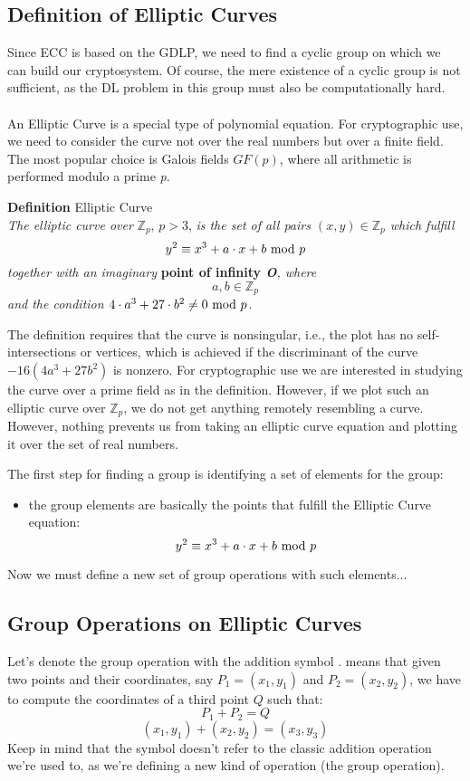 \subsection{Definition of Elliptic Curves}
Since ECC is based on the GDLP, we need to find a cyclic group on which we can build our cryptosystem. Of course, the mere existence of a cyclic group is not sufficient, as the DL problem in this group must also be computationally hard.\\\\
An Elliptic Curve is a special type of polynomial equation. For cryptographic use, we need to consider the curve not over the real numbers but over a finite field. The most popular choice is Galois fields $GF(p)$, where all arithmetic is performed modulo a prime \textit{p}.
\begin{framed}
    \hfill\break\textbf{Definition} Elliptic Curve\\
    \textit{The elliptic curve over} $\mathbb{Z}_p$, $p>3$, \textit{is the set of all pairs $(x,y)\in\mathbb{Z}_p$ which fulfill}
    $$y^2\equiv x^3+a\cdot x+b\text{ mod } p$$
    \textit{together with an imaginary} \textbf{point of infinity \textit{O}}\textit{, where}
    $$a,b\in\mathbb{Z}_p$$
    \textit{and the condition $4\cdot a^3+27\cdot b^2\not=0\text{ mod } p$.}
\end{framed}
The definition requires that the curve is nonsingular, i.e., the plot has no self-intersections or vertices, which is achieved if the discriminant of the curve $-16(4a^3+27b^2)$ is nonzero. For cryptographic use we are interested in studying the curve over a prime field as in the definition. However, if we plot such an elliptic curve over $\mathbb{Z}_p$, we do not get anything remotely resembling a curve. However, nothing prevents us from taking an elliptic curve equation and plotting it over the set of real numbers.

\newpage
\hfill\break
The first step for finding a group is identifying a set of elements for the group:
\begin{itemize}
    \item the group elements are basically the points that fulfill the Elliptic Curve equation:$$y^2\equiv x^3+a\cdot x+b\text{ mod } p$$
\end{itemize}
Now we must define a new set of group operations with such elements...

\subsection{Group Operations on Elliptic Curves}
Let's denote the group operation with the addition symbol \doublequotes{+}.  means that given two points and their coordinates, say $P_1=(x_1,y_1)$ and $P_2=(x_2,y_2)$, we have to compute the coordinates of a third point $Q$ such that:
$$P_1+P_2=Q$$
$$(x_1,y_1)+(x_2,y_2)=(x_3,y_3)$$
Keep in mind that the \doublequotes{+} symbol doesn't refer to the classic addition operation we're used to, as we're defining a new kind of operation (the group operation).


